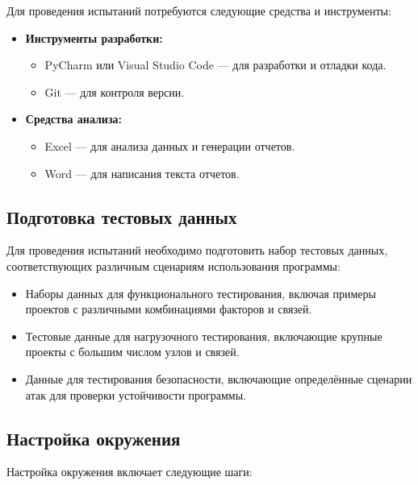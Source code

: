 \documentclass{article}
\begin{document}
    Для проведения испытаний потребуются следующие средства и инструменты:

    \begin{itemize}
        \item \textbf{Инструменты разработки:}
        \begin{itemize}
            \item PyCharm или Visual Studio Code — для разработки и отладки кода.
            \item Git — для контроля версии.
        \end{itemize}
        \item \textbf{Средства анализа:}
        \begin{itemize}
            \item Excel — для анализа данных и генерации отчетов.
            \item Word — для написания текста отчетов.
        \end{itemize}
    \end{itemize}

    \subsection{Подготовка тестовых данных}

    Для проведения испытаний необходимо подготовить набор тестовых данных, соответствующих различным сценариям использования программы:

    \begin{itemize}
        \item Наборы данных для функционального тестирования, включая примеры проектов с различными комбинациями факторов и связей.
        \item Тестовые данные для нагрузочного тестирования, включающие крупные проекты с большим числом узлов и связей.
        \item Данные для тестирования безопасности, включающие определённые сценарии атак для проверки устойчивости программы.
    \end{itemize}

    \subsection{Настройка окружения}

    Настройка окружения включает следующие шаги:
\end{document}
